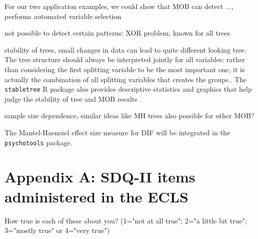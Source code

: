 \documentclass[doc,floatsintext,natbib]{apa7}
\begin{document}

For our two application examples, we could show that MOB can detect ..., performs automated variable selection  


not possible to detect certain patterns: XOR problem, known for all trees

stability of trees, small changes in data can lead to quite different looking tree. The tree structure should always be interpreted jointly for all variables: rather than considering the first splitting variable to be the most important one, it is actually the combination of all splitting variables that creates the groups.. The \texttt{stabletree} R package also provides descriptive statistics and graphics that help judge the stability of tree and MOB results \citep{PhiRusHor:2018:JoCaGS,PhiZeiStr:2016}. 



sample size dependence, similar ideas like MH trees also possible for other MOB?

The Mantel-Haenszel effect size measure for DIF will be integrated in the \texttt{psychotools} package. 






\newpage
\appendix



\section{Appendix A: SDQ-II items administered in the ECLS}
\label{sec:AppendixA}


How true is each of these about you? (1="not at all true"; 2="a little bit true"; 3="mostly true" or 4="very true")
\end{document}
